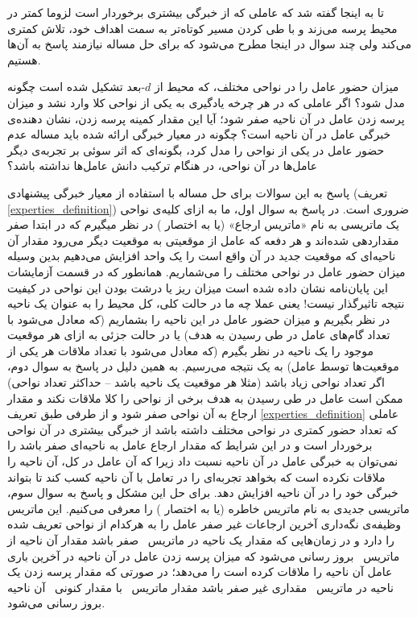 تا به اینجا گفته شد که عاملی که از خبرگی بیشتری برخوردار است لزوما کمتر در محیط پرسه می‌زند و با طی کردن مسیر کوتاه‌تر به سمت اهداف خود، تلاش کمتری می‌کند ولی چند سوال در اینجا مطرح می‌شود که برای حل مساله نیازمند پاسخ به آن‌ها هستیم.
\begin{enumerate}
 میزان حضور عامل را در نواحی مختلف، که محیط از $d$-بعد تشکیل شده است چگونه مدل شود؟
 اگر عاملی که در هر چرخه یادگیری به یکی از نواحی کلا وارد نشد و میزان پرسه زدن عامل در آن ناحیه صفر شود؛ آیا این مقدار کمینه پرسه زدن، نشان دهنده‌ی خبرگی عامل در آن ناحیه است؟
 چگونه در معیار خبرگی ارائه شده باید مساله عدم حضور عامل در یکی از نواحی را مدل کرد، بگونه‌ای که اثر سوئی بر تجربه‌ی دیگر عامل‌ها در آن نواحی، در هنگام ترکیب دانش عامل‌ها نداشته باشد؟
\end{enumerate}
پاسخ به این سوالات برای حل مساله با استفاده از معیار خبرگی پیشنهادی (تعریف \ref{experties_definition}) ضروری است. در پاسخ به سوال اول، ما به ازای کلیه‌ی نواحی یک ماتریسی به نام «ماتریس ارجاع» (یا به اختصار ) در نظر میگیرم که در ابتدا صفر مقداردهی شده‌اند و هر دفعه که عامل از موقعیتی‌ به موقعیت دیگر می‌رود مقدار آن ناحیه‌ای که موقعیت جدید در آن واقع است را یک واحد افزایش می‌دهیم بدین وسیله میزان حضور عامل در نواحی مختلف را می‌شماریم. همانطور که در قسمت آزمایشات این پایان‌نامه نشان داده شده است میزان ریز یا درشت بودن این نواحی در کیفیت نتیجه تاثیرگذار نیست! یعنی عملا چه ما در حالت کلی، کل محیط را به عنوان یک ناحیه در نظر بگیریم و میزان حضور عامل در این ناحیه را بشماریم (که معادل می‌شود با تعداد گام‌های عامل در طی رسیدن به هدف) یا در حالت جزئی به ازای هر موقعیت موجود را یک ناحیه در نظر بگیرم (که معادل می‌شود با تعداد ملاقات هر یکی از موقعیت‌ها توسط عامل) به یک نتیجه می‌رسیم.
به همین دلیل در پاسخ به سوال دوم، اگر تعداد نواحی زیاد باشد (مثلا هر موقعیت یک ناحیه باشد -- حداکثر تعداد نواحی) ممکن است عامل در طی رسیدن به هدف برخی از نواحی را کلا ملاقات نکند و مقدار ارجاع به آن نواحی صفر شود و از طرفی طبق تعریف \ref{experties_definition} عاملی که تعداد حضور کمتری در نواحی مختلف داشته باشد از خبرگی بیشتری در آن نواحی برخوردار است و در این شرایط که مقدار ارجاع عامل به ناحیه‌ای صفر باشد را نمی‌توان به خبرگی عامل در آن ناحیه نسبت داد زیرا که آن عامل در کل، آن ناحیه را ملاقات نکرده است که بخواهد تجربه‌ای را در تعامل با آن ناحیه کسب کند تا بتواند خبرگی خود را در آن ناحیه افزایش دهد. برای حل این مشکل و پاسخ به سوال سوم، ماتریسی جدیدی به نام ماتریس خاطره (یا به اختصار ) را معرفی می‌کنیم. این ماتریس وظیفه‌ی نگه‌داری آخرین ارجاعات غیر صفر عامل را به هرکدام از نواحی تعریف شده را دارد و در زمان‌هایی که مقدار یک ناحیه در ماتریس \ صفر باشد مقدار آن ناحیه از ماتریس \ بروز رسانی می‌شود که میزان پرسه زدن عامل در آن ناحیه در آخرین باری عامل آن ناحیه را ملاقات کرده است را می‌دهد؛ در صورتی که مقدار پرسه زدن یک ناحیه در ماتریس \ مقداری غیر صفر باشد مقدار ماتریس \ با مقدار کنونی \ آن ناحیه بروز رسانی می‌شود.
